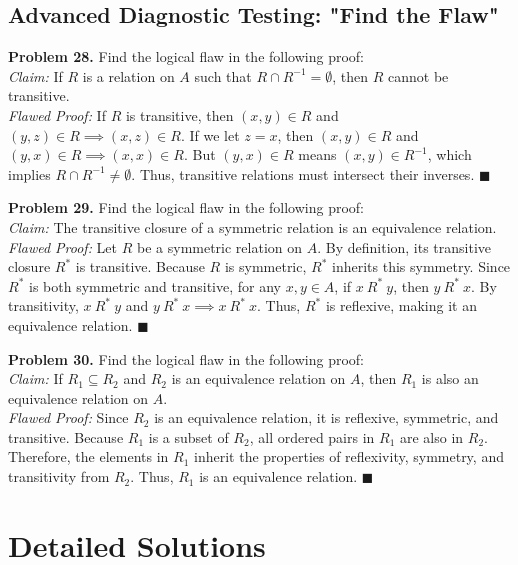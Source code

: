 \documentclass[11pt, a4paper]{article}
\theoremstyle{definition}
\theoremstyle{remark}
\begin{document}
\subsection{Advanced Diagnostic Testing: "Find the Flaw"}
\textbf{Problem 28.} Find the logical flaw in the following proof: \\
\textit{Claim:} If $R$ is a relation on $A$ such that $R \cap R^{-1} = \emptyset$, then $R$ cannot be transitive. \\
\textit{Flawed Proof:} If $R$ is transitive, then $(x,y) \in R$ and $(y,z) \in R \implies (x,z) \in R$. If we let $z = x$, then $(x,y) \in R$ and $(y,x) \in R \implies (x,x) \in R$. But $(y,x) \in R$ means $(x,y) \in R^{-1}$, which implies $R \cap R^{-1} \neq \emptyset$. Thus, transitive relations must intersect their inverses. $\blacksquare$

\vspace{0.5em}
\noindent
\textbf{Problem 29.} Find the logical flaw in the following proof: \\
\textit{Claim:} The transitive closure of a symmetric relation is an equivalence relation. \\
\textit{Flawed Proof:} Let $R$ be a symmetric relation on $A$. By definition, its transitive closure $R^*$ is transitive. Because $R$ is symmetric, $R^*$ inherits this symmetry. Since $R^*$ is both symmetric and transitive, for any $x, y \in A$, if $x \ R^* \ y$, then $y \ R^* \ x$. By transitivity, $x \ R^* \ y$ and $y \ R^* \ x \implies x \ R^* \ x$. Thus, $R^*$ is reflexive, making it an equivalence relation. $\blacksquare$

\vspace{0.5em}
\noindent
\textbf{Problem 30.} Find the logical flaw in the following proof: \\
\textit{Claim:} If $R_1 \subseteq R_2$ and $R_2$ is an equivalence relation on $A$, then $R_1$ is also an equivalence relation on $A$. \\
\textit{Flawed Proof:} Since $R_2$ is an equivalence relation, it is reflexive, symmetric, and transitive. Because $R_1$ is a subset of $R_2$, all ordered pairs in $R_1$ are also in $R_2$. Therefore, the elements in $R_1$ inherit the properties of reflexivity, symmetry, and transitivity from $R_2$. Thus, $R_1$ is an equivalence relation. $\blacksquare$

\newpage

\section{Detailed Solutions}
\end{document}
